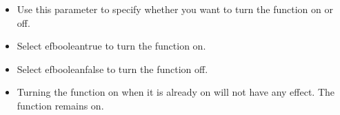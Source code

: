 % 
\begin{itemize}
\item Use this parameter to specify whether you want to turn the function on or off.
\item Select \app{}efbooleantrue{} to turn the function on.
\item Select \app{}efbooleanfalse{} to turn the function off.
\item Turning the function on when it is already on will not have any effect. The function remains on.
\end{itemize}
